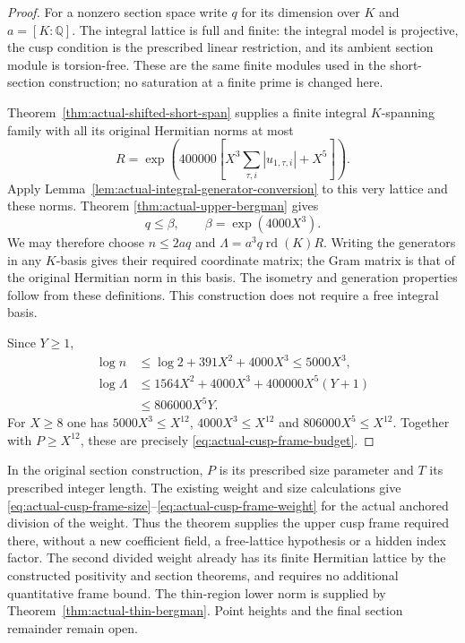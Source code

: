 \begin{proof}
For a nonzero section space write $q$ for its dimension over $K$
and $a=[K:\mathbb Q]$.  The integral lattice is full and finite:
the integral model is projective, the cusp condition is the
prescribed linear restriction, and its ambient section module is
torsion-free.  These are the same finite modules used in the
short-section construction; no saturation at a finite prime is
changed here.

Theorem~\ref{thm:actual-shifted-short-span} supplies a finite
integral $K$-spanning family with all its original Hermitian norms
at most
\[
 R=\exp\left(400000\left[X^3
                   \sum_{\tau,i}|u_{1,\tau,i}|+X^5\right]\right).
\]
Apply Lemma~\ref{lem:actual-integral-generator-conversion} to
this very lattice and these norms.  Theorem
\ref{thm:actual-upper-bergman} gives
\[
           q\le\beta,\qquad \beta=\exp(4000X^3).
\]
We may therefore choose $n\le2aq$ and
$\Lambda=a^3q\operatorname{rd}(K)R$.
Writing the generators in any $K$-basis gives their required
coordinate matrix; the Gram matrix is that of the original
Hermitian norm in this basis.  The isometry and generation
properties follow from these definitions.  This construction
does not require a free integral basis.

Since $Y\ge1$,
\begin{align*}
 \log n&\le\log2+391X^2+4000X^3\le5000X^3,\\
 \log\Lambda
 &\le1564X^2+4000X^3
                      +400000X^5(Y+1)\\
 &\le806000X^5Y.
\end{align*}
For $X\ge8$ one has $5000X^3\le X^{12}$,
$4000X^3\le X^{12}$ and $806000X^5\le X^{12}$.
Together with $P\ge X^{12}$, these are precisely
\eqref{eq:actual-cusp-frame-budget}.
\end{proof}

In the original section construction, $P$ is its prescribed size
parameter and $T$ its prescribed integer length.  The existing
weight and size calculations give
\eqref{eq:actual-cusp-frame-size}--\eqref{eq:actual-cusp-frame-weight}
for the actual anchored division of the weight.  Thus the theorem
supplies the upper cusp frame required there, without a new
coefficient field, a free-lattice hypothesis or a hidden index
factor.  The second divided weight already has its finite
Hermitian lattice by the constructed positivity and section
theorems, and requires no additional quantitative frame bound.
The thin-region lower norm is supplied by
Theorem~\ref{thm:actual-thin-bergman}. Point heights and the final
section remainder remain open.
